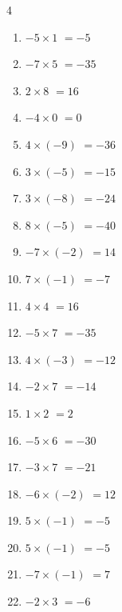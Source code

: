 \begin{multicols}{4}
\begin{enumerate}
  \item $-5\times 1$
        $=-5$

  \item $-7\times 5$
        $=-35$

  \item $2\times 8$
        $=16$

  \item $-4\times 0$
        $=0$

  \item $4\times (-9)$
        $=-36$

  \item $3\times (-5)$
        $=-15$

  \item $3\times (-8)$
        $=-24$

  \item $8\times (-5)$
        $=-40$

  \item $-7\times (-2)$
        $=14$

  \item $7\times (-1)$
        $=-7$

  \item $4\times 4$
        $=16$

  \item $-5\times 7$
        $=-35$

  \item $4\times (-3)$
        $=-12$

  \item $-2\times 7$
        $=-14$

  \item $1\times 2$
        $=2$

  \item $-5\times 6$
        $=-30$

  \item $-3\times 7$
        $=-21$

  \item $-6\times (-2)$
        $=12$

  \item $5\times (-1)$
        $=-5$

  \item $5\times (-1)$
        $=-5$

  \item $-7\times (-1)$
        $=7$

\columnbreak %

  \item $-2\times 3$
        $=-6$


\end{enumerate}
\end{multicols}
